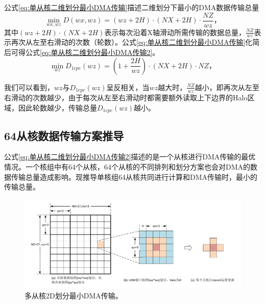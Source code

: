\documentclass[degree=doctor]{thuthesis}
\begin{document}
公式\ref{eq:单从核二维划分最小DMA传输}描述二维划分下最小的DMA数据传输总量
\begin{equation}
  \min_{wx,wz} D(wx,wz) = (wz+2H)\cdot(NX+2H)\cdot\frac{NZ}{wz}，
  \label{eq:单从核二维划分最小DMA传输}
\end{equation}
其中$(wz+2H)\cdot(NX+2H)$表示每次沿着X轴滑动所需传输的数据总量，$\frac{NZ}{wz}$表示再次从左至右滑动的次数（轮数）。公式\ref{eq:单从核二维划分最小DMA传输}化简后可得公式\ref{eq:单从核二维划分最小DMA传输2}。
\begin{equation}
  \min_{wz} D_{1cpe}(wz) = (1+\frac{2H}{wz})\cdot(NX+2H)\cdot NZ，
  \label{eq:单从核二维划分最小DMA传输2}
\end{equation}

我们可以看到，$wz$与$D_{1cpe}(wz)$呈反相关，当$wz$越大时，$\frac{NZ}{wz}$越小，即再次从左至右滑动的次数越少，由于每次从左至右滑动时都需要额外读取上下边界的Halo区域，因此轮数越少，传输总量$D_{1cpe}(wz)$越小。

\subsection{64从核数据传输方案推导}
公式\ref{eq:单从核二维划分最小DMA传输2}描述的是一个从核进行DMA传输的最优情况。一个核组中有64个从核，64个从核的不同排列和划分方案也会对DMA的数据传输总量造成影响。现推导单核组64从核共同进行计算和DMA传输时，最小的传输总量。

\begin{figure}[ht]
  \centering
  \includegraphics[width=1.0\columnwidth]{多从核2D划分最小DMA传输.pdf}
  \caption{多从核2D划分最小DMA传输。}
  \label{fig:multi-cpe-2d-derive}
\end{figure}
\end{document}

